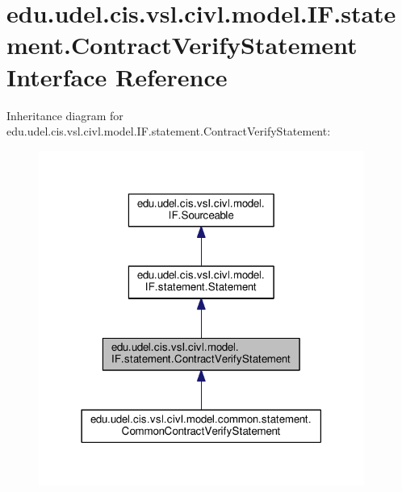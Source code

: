 \hypertarget{interfaceedu_1_1udel_1_1cis_1_1vsl_1_1civl_1_1model_1_1IF_1_1statement_1_1ContractVerifyStatement}{}\section{edu.\+udel.\+cis.\+vsl.\+civl.\+model.\+I\+F.\+statement.\+Contract\+Verify\+Statement Interface Reference}
\label{interfaceedu_1_1udel_1_1cis_1_1vsl_1_1civl_1_1model_1_1IF_1_1statement_1_1ContractVerifyStatement}


Inheritance diagram for edu.\+udel.\+cis.\+vsl.\+civl.\+model.\+I\+F.\+statement.\+Contract\+Verify\+Statement\+:
\nopagebreak
\begin{figure}[H]
\begin{center}
\leavevmode
\includegraphics[width=302pt]{interfaceedu_1_1udel_1_1cis_1_1vsl_1_1civl_1_1model_1_1IF_1_1statement_1_1ContractVerifyStatement__inherit__graph}
\end{center}
\end{figure}


